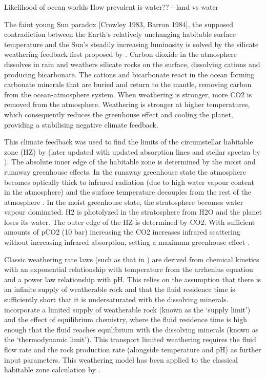 \documentclass[fleqn,usenatbib]{mnras}
\begin{document}
Likelihood of ocean worlds
How prevalent is water??
\cite{guimond_water_2026} - land vs water

The faint young Sun paradox [Crowley 1983, Barron 1984], the supposed contradiction between the Earth's relatively unchanging habitable surface temperature and the Sun's steadily increasing luminosity is solved by the silicate weathering feedback first proposed by \cite{walker_negative_1981}. Carbon dioxide in the atmosphere dissolves in rain and weathers silicate rocks on the surface, dissolving cations and producing bicarbonate. The cations and bicarbonate react in the ocean forming carbonate minerals that are buried and return to the mantle, removing carbon from the ocean-atmosphere system. When weathering is stronger, more CO2 is removed from the atmosphere. Weathering is stronger at higher temperatures, which consequently reduces the greenhouse effect and cooling the planet, providing a stabilising negative climate feedback.

This climate feedback was used to find the limits of the circumstellar habitable zone (HZ) by \cite{kasting_habitable_1993} (later updated with updated absorption lines and stellar spectra by \cite{kopparapu_habitable_2013}). The absolute inner edge of the habitable zone is determined by the moist and runaway greenhouse effects. In the runaway greenhouse state the atmosphere becomes optically thick to infrared radiation (due to high water vapour content in the atmosphere) and the surface temperature decouples from the rest of the atmosphere \citep{innes_runaway_2023, ingersoll_runaway_1969}. In the moist greenhouse state, the stratosphere becomes water vapour dominated. H2 is photolyzed in the stratosphere from H2O and the planet loses its water. The outer edge of the HZ is determined by CO2. With sufficient amounts of pCO2 (10 bar) increasing the CO2 increases infrared scattering without increasing infrared absorption, setting a maximum greenhouse effect \citep{kasting_co_1991, kopparapu_habitable_2013}. %

Classic weathering rate laws (such as that in \cite{walker_negative_1981}) are derived from chemical kinetics with an exponential relationship with temperature from the arrhenius equation and a power law relationship with pH. This relies on the assumption that there is an infinite supply of weatherable rock and that the fluid residence time is sufficiently short that it is undersaturated with the dissolving minerals. \cite{maher_hydrologic_2014} incorporate a limited supply of weatherable rock (known as the `supply limit') and the effect of equilibrium chemistry, where the fluid residence time is high enough that the fluid reaches equilibrium with the dissolving minerals (known as the `thermodynamic limit'). This transport limited weathering requires the fluid flow rate and the rock production rate (alongside temperature and pH) as further input parameters. This weathering model has been applied to the classical habitable zone calculation by \cite{graham_thermodynamic_2020}.
\end{document}

